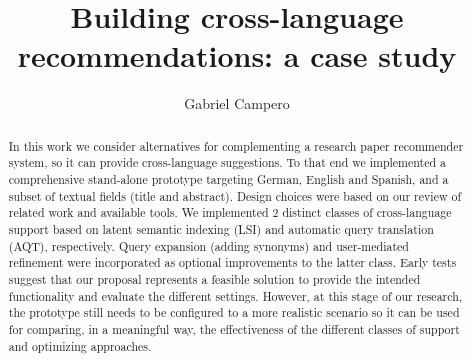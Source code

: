 \documentclass{llncs}
\begin{document}
%
\frontmatter          %
%
\pagestyle{headings}  %
%
\mainmatter              %
%
\title{Building cross-language recommendations: a case study}
%
%
\author{Gabriel Campero}
%
%
%

\maketitle              %

\begin{abstract}
In this work we consider alternatives for complementing a research paper recommender system, so it can provide cross-language suggestions. To that end we implemented a comprehensive stand-alone prototype targeting German, English and Spanish, and a subset of textual fields (title and abstract). Design choices were based on our review of related work and available tools. We implemented 2 distinct classes of cross-language support based on latent semantic indexing (LSI) and automatic query translation (AQT), respectively. Query expansion (adding synonyms) and user-mediated refinement were incorporated as optional improvements to the latter class. Early tests suggest that our proposal represents a feasible solution to provide the intended functionality and evaluate the different settings. However, at this stage of our research, the prototype still needs to be configured to a more realistic scenario so it can be used for comparing, in a meaningful way, the effectiveness of the different classes of support and optimizing approaches.

\end{abstract}
\end{document}

